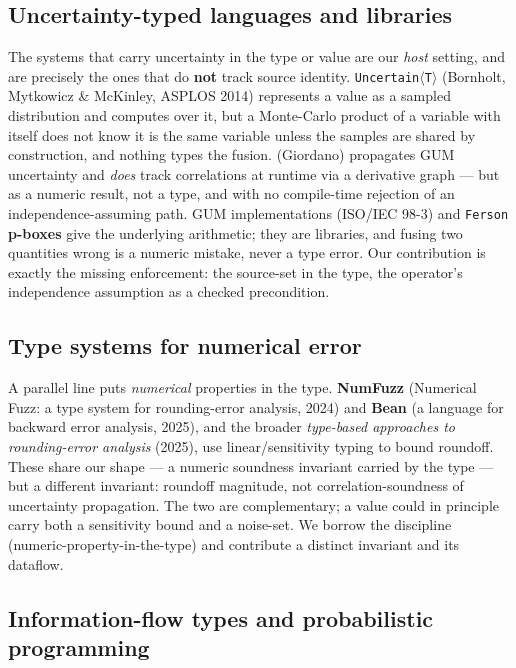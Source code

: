 \documentclass[sigplan,review,anonymous,10pt]{acmart}
\begin{document}
\subsection{Uncertainty-typed languages and libraries}

The systems that carry uncertainty in the type or value are our \emph{host} setting, and are precisely the ones that do \textbf{not} track source identity. \texttt{Uncertain$\langle$T$\rangle$} (Bornholt, Mytkowicz \& McKinley, ASPLOS 2014) represents a value as a sampled distribution and computes over it, but a Monte-Carlo product of a variable with itself does not know it is the same variable unless the samples are shared by construction, and nothing types the fusion.  (Giordano) propagates GUM uncertainty and \emph{does} track correlations at runtime via a derivative graph --- but as a numeric result, not a type, and with no compile-time rejection of an independence-assuming path. GUM implementations (ISO/IEC 98-3) and \texttt{Ferson} \textbf{p-boxes} give the underlying arithmetic; they are libraries, and fusing two quantities wrong is a numeric mistake, never a type error. Our contribution is exactly the missing enforcement: the source-set in the type, the operator's independence assumption as a checked precondition.

\subsection{Type systems for numerical error}

A parallel line puts \emph{numerical} properties in the type. \textbf{NumFuzz} (Numerical Fuzz: a type system for rounding-error analysis, 2024) and \textbf{Bean} (a language for backward error analysis, 2025), and the broader \emph{type-based approaches to rounding-error analysis} (2025), use linear/sensitivity typing to bound roundoff. These share our shape --- a numeric soundness invariant carried by the type --- but a different invariant: roundoff magnitude, not correlation-soundness of uncertainty propagation. The two are complementary; a value could in principle carry both a sensitivity bound and a noise-set. We borrow the discipline (numeric-property-in-the-type) and contribute a distinct invariant and its dataflow.

\subsection{Information-flow types and probabilistic programming}
\end{document}
